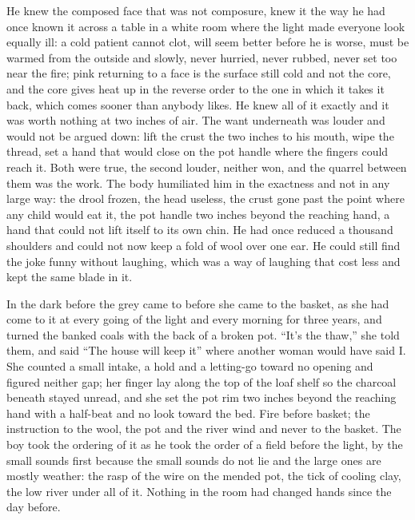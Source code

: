 He knew the composed face that was not composure, knew it the way he had once known it across a table in a white room where the light made everyone look equally ill: a cold patient cannot clot, will seem better before he is worse, must be warmed from the outside and slowly, never hurried, never rubbed, never set too near the fire; pink returning to a face is the surface still cold and not the core, and the core gives heat up in the reverse order to the one in which it takes it back, which comes sooner than anybody likes. He knew all of it exactly and it was worth nothing at two inches of air. The want underneath was louder and would not be argued down: lift the crust the two inches to his mouth, wipe the thread, set a hand that would close on the pot handle where the fingers could reach it. Both were true, the second louder, neither won, and the quarrel between them was the work. The body humiliated him in the exactness and not in any large way: the drool frozen, the head useless, the crust gone past the point where any child would eat it, the pot handle two inches beyond the reaching hand, a hand that could not lift itself to its own chin. He had once reduced a thousand shoulders and could not now keep a fold of wool over one ear. He could still find the joke funny without laughing, which was a way of laughing that cost less and kept the same blade in it.

In the dark before the grey  came to  before she came to the basket, as she had come to it at every going of the light and every morning for three years, and turned the banked coals with the back of a broken pot. “It's the thaw,” she told them, and said “The house will keep it” where another woman would have said I. She counted a small intake, a hold and a letting-go toward no opening and figured neither gap; her finger lay along the top of the loaf shelf so the charcoal beneath stayed unread, and she set the pot rim two inches beyond the reaching hand with a half-beat and no look toward the bed. Fire before basket; the instruction to the wool, the pot and the river wind and never to the basket. The boy took the ordering of it as he took the order of a field before the light, by the small sounds first because the small sounds do not lie and the large ones are mostly weather: the rasp of the wire on the mended pot, the tick of cooling clay, the low river under all of it. Nothing in the room had changed hands since the day before.

\scenebreak

